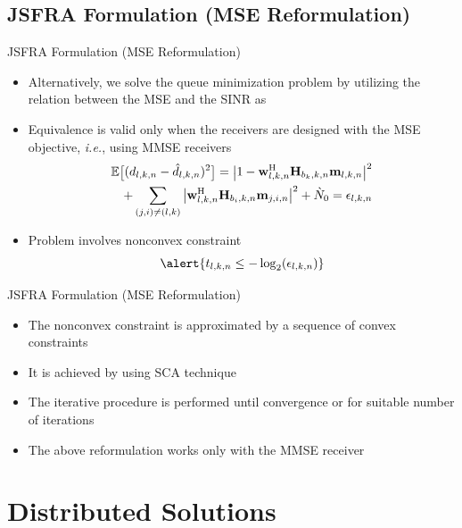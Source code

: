 \documentclass[9pt]{beamer}
\begin{document}
\subsection{\acs{JSFRA} Formulation (\acs{MSE} Reformulation)}

\begin{frame}{\acs{JSFRA} Formulation (\acs{MSE} Reformulation)}
	\begin{itemize}
	\item Alternatively, we solve the queue minimization problem by utilizing the relation between the \acs{MSE} and the \acs{SINR} as 
	\item Equivalence is valid only when the receivers are designed with the \ac{MSE} objective, \textit{i.e.}, using \acs{MMSE} receivers
	\begin{eqnarray} \label{mse-error} \scriptsize
	\mathbb{E} \big [ ( d_{l,k,n} - \hat{d}_{l,k,n} )^2 \big ] = \big | 1 - \mathbf{w}_{l,k,n}^{\mathrm{H}} \mathbf{H}_{b_k,k,n} \mathbf{m}_{l,k,n} \big |^2 \nonumber \\
	+ \sum_{{(j,i) \neq (l,k)}} \big | \mathbf{w}_{l,k,n}^{\mathrm{H}} \mathbf{H}_{b_i,k,n} \mathbf{m}_{j,i,n} \big |^2 + \grave{N}_0 = \epsilon_{l,k,n}
	\end{eqnarray}
	\item Problem involves nonconvex constraint 
	\begin{equation}
	\alert{t_{l,k,n} \leq -\log_2(\epsilon_{l,k,n})}
	\end{equation}
	\end{itemize}
\end{frame}

\begin{frame}{\acs{JSFRA} Formulation (\acs{MSE} Reformulation)}
	\begin{itemize}
		\item The nonconvex constraint is approximated by a sequence of convex constraints
		\item It is achieved by using \ac{SCA} technique
		\item The iterative procedure is performed until convergence or for suitable number of iterations
		\item \alert{The above reformulation works only with the \acs{MMSE} receiver}
	\end{itemize}
\end{frame}

\section{Distributed Solutions}
\end{document}
